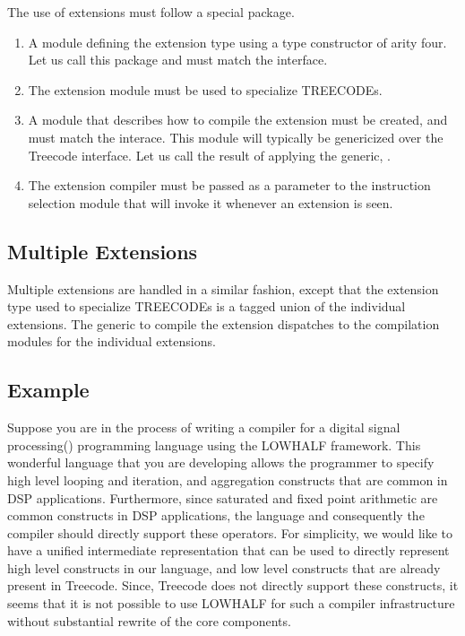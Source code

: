 The use of extensions must follow a special package. 
\begin{enumerate}
 \item A module defining the extension type using a type constructor
of arity four. Let us call this package  and must match
the  interface.
 \item The extension module must be used to specialize TREECODEs. 
 \item A module that describes how to compile the extension must be
created, and must match the  interace.
This module will typically be genericized over the Treecode interface.
Let us call the result of applying the generic, .
 \item The extension compiler must be passed as a parameter to the
instruction selection module that will invoke it whenever an extension 
is seen.
\end{enumerate}


\subsection{Multiple Extensions}

Multiple extensions are handled in a similar fashion, except that the
extension type used to specialize TREECODEs is a tagged union of the
individual extensions. The generic to compile the extension dispatches 
to the compilation modules for the individual extensions.

\subsection{Example}
Suppose you are in the process of writing a compiler for a digital
signal processing() programming language using the LOWHALF
framework.  This wonderful language that you are developing allows the
programmer to specify high level looping and iteration, and
aggregation constructs that are common in DSP applications.
Furthermore, since saturated and fixed point arithmetic are common
constructs in DSP applications, the language and consequently the
compiler should directly support these operators.  For simplicity, we
would like to have a unified intermediate representation that can be
used to directly represent high level constructs in our language, and
low level constructs that are already present in Treecode.  Since,
Treecode does not directly support these constructs, it seems that it is
not possible to use LOWHALF for such a compiler infrastructure without
substantial rewrite of the core components.

